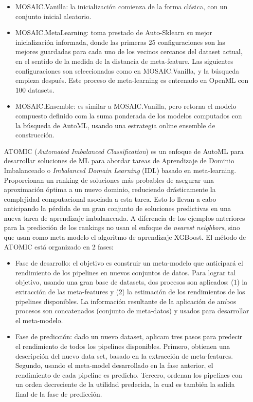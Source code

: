 \begin{itemize}
	\item MOSAIC.Vanilla: la inicialización comienza de la forma clásica, con un conjunto inicial aleatorio.
	\item MOSAIC.MetaLearning: toma prestado de Auto-Sklearn su mejor inicialización informada, donde las primeras 25 configuraciones son las mejores guardadas para cada uno de los vecinos cercanos del dataset actual, en el sentido de la medida de la distancia de meta-feature. Las siguientes configuraciones son seleccionadas como en MOSAIC.Vanilla, y la búsqueda empieza después. Este proceso de meta-learning es entrenado en OpenML con 100 datasets.
	\item MOSAIC.Ensemble: es similar a MOSAIC.Vanilla, pero retorna el modelo compuesto definido com la suma ponderada de los modelos computados con la búsqueda de AutoML, usando una estrategia online ensemble de construcción.
\end{itemize}

ATOMIC (\textit{Automated Imbalanced Classification}) es un enfoque de AutoML para desarrollar soluciones de ML para abordar tareas de Aprendizaje de Dominio Imbalanceado o \textit{Imbalanced Domain Learning} (IDL) basado en meta-learning. Proporcionan un ranking de soluciones más probables de asegurar una aproximación óptima a un nuevo dominio, reduciendo drásticamente la complejidad computacional asociada a esta tarea. Esto lo llevan a cabo anticipando la pérdida de un gran conjunto de soluciones predictivas en una nueva tarea de aprendizaje imbalanceada. A diferencia de los ejemplos anteriores para la predicción de los rankings no usan el enfoque de \textit{nearest neighbors}, sino que usan como meta-modelo el algoritmo de aprendizaje XGBoost. El método de ATOMIC está organizado en 2 fases:

\begin{itemize}
	\item Fase de desarrollo: el objetivo es construir un meta-modelo que anticipará el rendimiento de los pipelines en nuevos conjuntos de datos. Para lograr tal objetivo, usando una gran base de datasets, dos procesos son aplicados: (1) la extracción de las meta-features y (2) la estimación de los rendimientos de los pipelines disponibles. La información resultante de la aplicación de ambos procesos son concatenados (conjunto de meta-datos) y usados para desarrollar el meta-modelo.
	\item Fase de predicción: dado un nuevo dataset, aplicam tres pasos para predecir el rendimiento de todos los pipelines disponibles. Primero, obtienen una descripción del nuevo data set, basado en la extracción de meta-features. Segundo, usando el meta-model desarrollado en la fase anterior, el rendimiento de cada pipeline es predicho. Tercero, ordenan los pipelines con un orden decreciente de la utilidad predecida, la cual es también la salida final de la fase de predicción.
\end{itemize}

